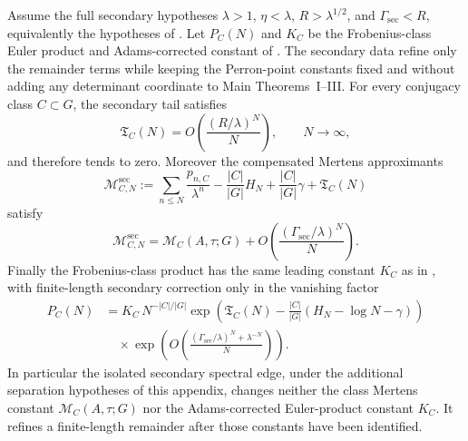 \begin{proposition}
  \label{prop:secondary-tail-only-refinement}
  Assume the full secondary hypotheses \(\lambda>1\),
  \(\eta<\lambda\), \(R>\lambda^{1/2}\), and
  \(\Gamma_{\mathrm{sec}}<R\), equivalently the hypotheses of
  .  Let \(P_C(N)\) and \(K_C\)
  be the Frobenius-class Euler product and Adams-corrected constant of
  . The secondary data refine only
  the remainder terms while keeping the Perron-point constants fixed and
  without adding any determinant coordinate to Main Theorems~I--III. For
  every conjugacy class
  \(C\subset G\), the secondary tail satisfies
  \[
    \mathfrak T_C(N)=O\!\left(\frac{(R/\lambda)^N}{N}\right),
    \qquad N\to\infty,
  \]
  and therefore tends to zero. Moreover the compensated Mertens
  approximants
  \[
    \mathcal M_{C,N}^{\mathrm{sec}}
    :=
    \sum_{n\le N}\frac{p_{n,C}}{\lambda^n}
    -\frac{|C|}{|G|}H_N
    +\frac{|C|}{|G|}\gamma
    +\mathfrak T_C(N)
  \]
  satisfy
  \[
    \mathcal M_{C,N}^{\mathrm{sec}}
    =
    \mathcal M_C(A,\tau;G)
    +O\!\left(\frac{(\Gamma_{\mathrm{sec}}/\lambda)^N}{N}\right).
  \]
  Finally the Frobenius-class product has the same leading constant
  \(K_C\) as in , with finite-length
  secondary correction only in the vanishing factor
  \begin{equation}\label{eq:secondary-product-tail-only}
  \begin{aligned}
    P_C(N)
    &=
    K_C\,N^{-|C|/|G|}
    \exp\!\left(\mathfrak T_C(N)-\frac{|C|}{|G|}(H_N-\log N-\gamma)
    \right)\\
    &\quad\times
    \exp\!\left(
      O\!\left(\frac{(\Gamma_{\mathrm{sec}}/\lambda)^N+\lambda^{-N}}{N}\right)
    \right).
  \end{aligned}
  \end{equation}
  In particular the isolated secondary spectral edge, under the additional
  separation hypotheses of this appendix, changes neither the class
  Mertens constant \(\mathcal M_C(A,\tau;G)\) nor the Adams-corrected
  Euler-product constant \(K_C\). It refines a finite-length remainder
  after those constants have been identified.
\end{proposition}

